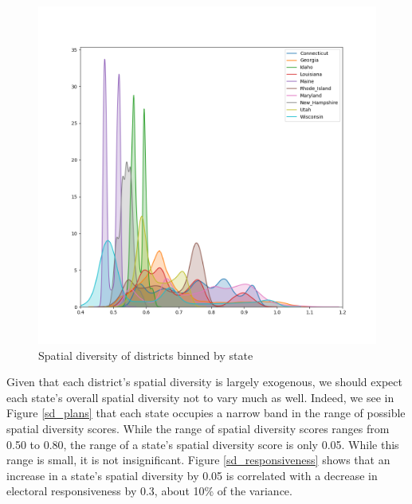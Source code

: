 \documentclass[]{article}
\begin{document}
\begin{figure}
\centering
\includegraphics{../30_results/all_districts_sd.png}
\caption{Spatial diversity of districts binned by state
\label{sd_districts_binned}}
\end{figure}

Given that each district's spatial diversity is largely exogenous, we
should expect each state's overall spatial diversity not to vary much as
well. Indeed, we see in Figure \ref{sd_plans} that each state occupies a
narrow band in the range of possible spatial diversity scores. While the
range of spatial diversity scores ranges from 0.50 to 0.80, the range of
a state's spatial diversity score is only 0.05. While this range is
small, it is not insignificant. Figure \ref{sd_responsiveness} shows
that an increase in a state's spatial diversity by 0.05 is correlated
with a decrease in electoral responsiveness by 0.3, about 10\% of the
variance.
\end{document}

